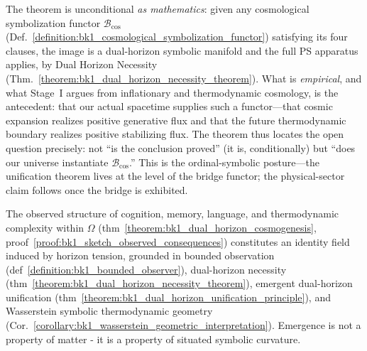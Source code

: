 \begin{scholium}
\label{scholium:bk1_cosmogenesis_proof_status}
The theorem is unconditional \emph{as mathematics}: given any cosmological
symbolization functor $\mathcal{B}_{\mathrm{cos}}$
(Def.~\ref{definition:bk1_cosmological_symbolization_functor}) satisfying its four
clauses, the image is a dual-horizon symbolic manifold and the full PS apparatus
applies, by Dual Horizon Necessity
(Thm.~\ref{theorem:bk1_dual_horizon_necessity_theorem}). What is \emph{empirical},
and what Stage~I argues from inflationary and thermodynamic cosmology, is the
antecedent: that our actual spacetime supplies such a functor---that cosmic
expansion realizes positive generative flux and that the future thermodynamic
boundary realizes positive stabilizing flux. The theorem thus locates the open
question precisely: not ``is the conclusion proved'' (it is, conditionally) but
``does our universe instantiate $\mathcal{B}_{\mathrm{cos}}$.'' This is the
ordinal-symbolic posture---the unification theorem lives at the level of the
bridge functor; the physical-sector claim follows once the bridge is exhibited.
\end{scholium}
\begin{corollary}
\label{corollary:bk1_event_horizon_identity_field}
The observed structure of cognition, memory, language, and thermodynamic complexity within $\Omega$ (thm~\ref{theorem:bk1_dual_horizon_cosmogenesis}, proof~\ref{proof:bk1_sketch_observed_consequences}) constitutes an identity field induced by horizon tension, grounded in bounded observation (def~\ref{definition:bk1_bounded_observer}), dual-horizon necessity (thm~\ref{theorem:bk1_dual_horizon_necessity_theorem}), emergent dual-horizon unification (thm~\ref{theorem:bk1_dual_horizon_unification_principle}), and Wasserstein symbolic thermodynamic geometry (Cor.~\ref{corollary:bk1_wasserstein_geometric_interpretation}). Emergence is not a property of matter - it is a property of situated symbolic curvature.
\end{corollary}
